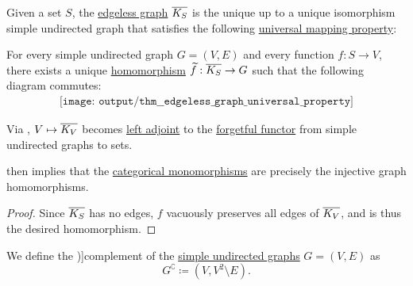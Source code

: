 \begin{theorem}\label{thm:edgeless_graph_universal_property}
  Given a set \( S \), the \hyperref[def:edgeless_graph]{edgeless graph} \( \oline{K_S} \) is the unique up to a unique isomorphism simple undirected graph that satisfies the following \hyperref[rem:universal_mapping_property]{universal mapping property}:
  \begin{displayquote}
    For every simple undirected graph \( G = (V, E) \) and every function \( f: S \to V \), there exists a unique \hyperref[def:undirected_graph/homomorphism]{homomorphism} \( \widetilde{f}: \oline{K_S} \to G \) such that the following diagram commutes:
    \begin{equation}\label{eq:thm:edgeless_graph_universal_property/diagram}
      \begin{aligned}
        \texttt{[image: output/thm\_\_edgeless\_graph\_universal\_property]}
      \end{aligned}
    \end{equation}
  \end{displayquote}
\end{theorem}
\begin{comments}
  \item Via , \( V \mapsto \oline{K_V} \) becomes \hyperref[def:category_adjunction]{left adjoint} to the \hyperref[def:concrete_category]{forgetful functor} from simple undirected graphs to sets.

   then implies that the \hyperref[def:morphism_invertibility/left_cancellative]{categorical monomorphisms} are precisely the injective graph homomorphisms.
\end{comments}
\begin{proof}
  Since \( \oline{K_S} \) has no edges, \( f \) vacuously preserves all edges of \( \oline{K_V} \), and is thus the desired homomorphism.
\end{proof}

\begin{definition}\label{def:graph_complement}
  We define the \term[ru=дополнение (\cite[15]{ЕмеличевИПр1990Графы})]{complement} of the \hyperref[def:undirected_graph]{simple undirected graphs} \( G = (V, E) \) as
  \begin{equation*}
     G^{\complement} \coloneqq (V, V^2 \setminus E).
  \end{equation*}
\end{definition}

